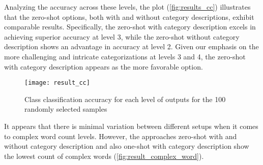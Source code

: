 Analyzing the accuracy across these levels, the plot (\autoref{fig:results_cc}) illustrates that the zero-shot options, both with and without category descriptions, exhibit comparable results. Specifically, the zero-shot with category description excels in achieving superior accuracy at level 3, while the zero-shot without category description shows an advantage in accuracy at level 2. Given our emphasis on the more challenging and intricate categorizations at levels 3 and 4, the zero-shot with category description appears as the more favorable option.


 

\begin{figure}[H]
	\centering
	\texttt{[image: result\_cc]}
	\caption{Class classification accuracy for each level of outputs for the 100 randomly selected samples}
	\label{fig:results_cc}
\end{figure}

It appears that there is minimal variation between different setups when it comes to complex word count levels. However, the approaches zero-shot with and without category description and also one-shot with category description show the lowest count of complex words (\autoref{fig:result_complex_word}). 


